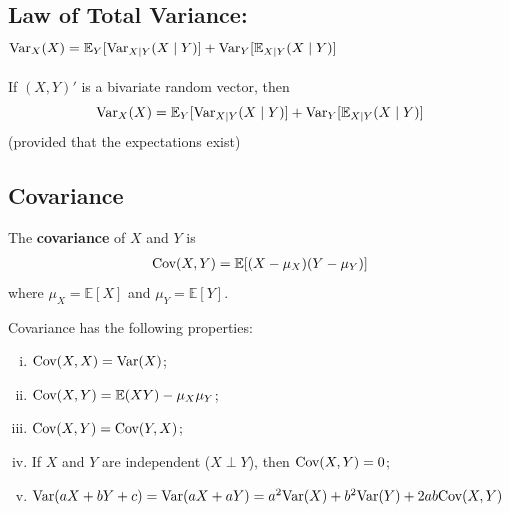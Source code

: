 \documentclass[11pt]{elegantbook}
\begin{document}
\subsection{Law of Total Variance: $\textnormal{Var}_X(X)=\mathbb{E}_Y[\textnormal{Var}_{X|Y}(X\mid Y)]+\textnormal{Var}_Y[\mathbb{E}_{X|Y}(X\mid Y)]$}
\begin{theorem}
    If $(X,Y)'$ is a bivariate random vector, then $$\textnormal{Var}_X(X)=\mathbb{E}_Y[\textnormal{Var}_{X|Y}(X\mid Y)]+\textnormal{Var}_Y[\mathbb{E}_{X|Y}(X\mid Y)]$$
    (provided that the expectations exist)
\end{theorem}

\subsection{Covariance}
\begin{definition}[Covariance]
    \normalfont
    The \textbf{covariance} of $X$ and $Y$ is
    \begin{equation}
        \begin{aligned}
            \textnormal{Cov}(X,Y)=\mathbb{E}[(X-\mu_X)(Y-\mu_Y)]
        \end{aligned}
        \nonumber
    \end{equation}
    where $\mu_X=\mathbb{E}[X]$ and $\mu_Y=\mathbb{E}[Y]$.
\end{definition}
\begin{proposition}
    Covariance has the following properties:
    \begin{enumerate}[(i).]
        \item $\textnormal{Cov}(X,X)=\textnormal{Var}(X)$;
        \item $\textnormal{Cov}(X,Y)=\mathbb{E}(XY)-\mu_X\mu_Y$;
        \item $\textnormal{Cov}(X,Y)=\textnormal{Cov}(Y,X)$;
        \item If $X$ and $Y$ are independent ($X\perp Y$), then $\textnormal{Cov}(X,Y)=0$;
        \item $\textnormal{Var}(aX+bY+c)=\textnormal{Var}(aX+aY)=a^2 \textnormal{Var}(X)+ b^2 \textnormal{Var}(Y)+2ab \textnormal{Cov}(X,Y)$
    \end{enumerate}
\end{proposition}
\end{document}
